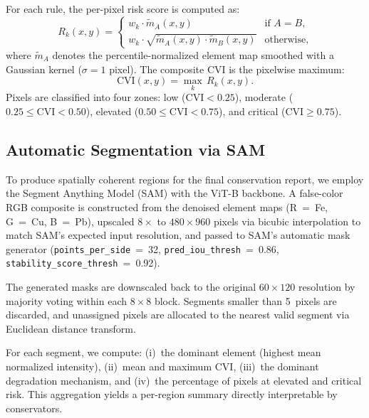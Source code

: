 \documentclass[twocolumn,11pt]{article}
\begin{document}
For each rule, the per-pixel risk score is computed as:
\begin{equation}
  R_k(x, y) =
  \begin{cases}
    w_k \cdot \tilde{m}_{A}(x,y)
      & \text{if } A = B, \\[4pt]
    w_k \cdot \sqrt{\tilde{m}_{A}(x,y) \cdot \tilde{m}_{B}(x,y)}
      & \text{otherwise},
  \end{cases}
  \label{eq:cvi_rule}
\end{equation}
where $\tilde{m}_{A}$ denotes the percentile-normalized element map smoothed
with a Gaussian kernel ($\sigma = 1$ pixel). The composite CVI is the
pixelwise maximum:
\begin{equation}
  \text{CVI}(x, y) = \max_k\, R_k(x, y).
  \label{eq:cvi_composite}
\end{equation}
Pixels are classified into four zones: low ($\text{CVI} < 0.25$), moderate
($0.25 \le \text{CVI} < 0.50$), elevated ($0.50 \le \text{CVI} < 0.75$),
and critical ($\text{CVI} \ge 0.75$).

\subsection{Automatic Segmentation via SAM}
\label{sec:sam}

To produce spatially coherent regions for the final conservation report, we
employ the Segment Anything Model (SAM) \citep{kirillov2023sam} with the
ViT-B backbone. A false-color RGB composite is constructed from the denoised
element maps (R~=~Fe, G~=~Cu, B~=~Pb), upscaled $8\times$ to
$480 \times 960$ pixels via bicubic interpolation to match SAM's expected
input resolution, and passed to SAM's automatic mask generator
(\texttt{points\_per\_side}~=~32, \texttt{pred\_iou\_thresh}~=~0.86,
\texttt{stability\_score\_thresh}~=~0.92).

The generated masks are downscaled back to the original $60 \times 120$
resolution by majority voting within each $8 \times 8$ block. Segments
smaller than 5~pixels are discarded, and unassigned pixels are allocated
to the nearest valid segment via Euclidean distance transform.

For each segment, we compute: (i)~the dominant element (highest mean
normalized intensity), (ii)~mean and maximum CVI, (iii)~the dominant
degradation mechanism, and (iv)~the percentage of pixels at elevated and
critical risk. This aggregation yields a per-region summary directly
interpretable by conservators.
\end{document}
